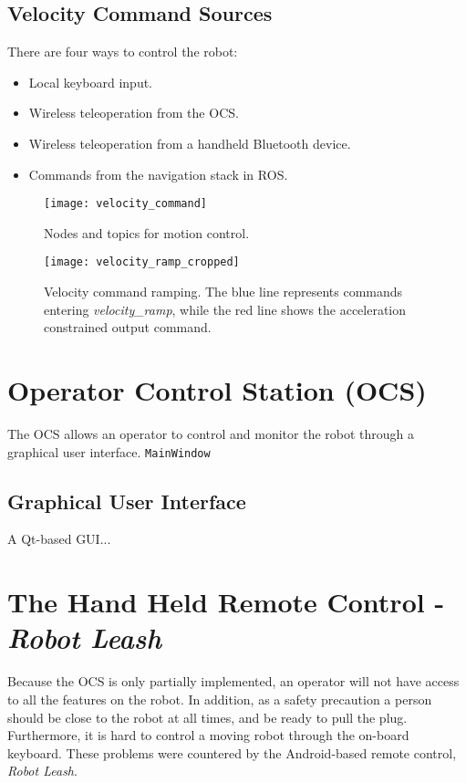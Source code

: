 \subsection{Velocity Command Sources}

There are four ways to control the robot:

\begin{itemize}
	\item Local keyboard input.
	\item Wireless teleoperation from the \ac{OCS}.
	\item Wireless teleoperation from a handheld Bluetooth device.
	\item Commands from the navigation stack in \ac{ROS}.
\end{itemize}

\begin{figure}[p]
	\centering
	\texttt{[image: velocity\_command]}
	\caption{Nodes and topics for motion control. }
	\label{fig:move_base_nodes}
\end{figure}

\begin{figure}[p]
	\centering
	\texttt{[image: velocity\_ramp\_cropped]}
	\caption{Velocity command ramping. The blue line represents commands entering \textit{velocity\_ramp}, while the red line shows the acceleration constrained output command.}
	\label{fig:velocity_ramp}
\end{figure}

\section{Operator Control Station (OCS)}

The \ac{OCS} allows an operator to control and monitor the robot through a graphical user interface. \texttt{MainWindow}

\subsection{Graphical User Interface}

A Qt-based \ac{GUI}...

\section{The Hand Held Remote Control - \textit{Robot Leash}}

Because the \ac{OCS} is only partially implemented, an operator will not have access to all the features on the robot. In addition, as a safety precaution a person should be close to the robot at all times, and be ready to pull the plug. Furthermore, it is hard to control a moving robot through the on-board keyboard. These problems were countered by the Android-based remote control, \textit{Robot Leash}. 


